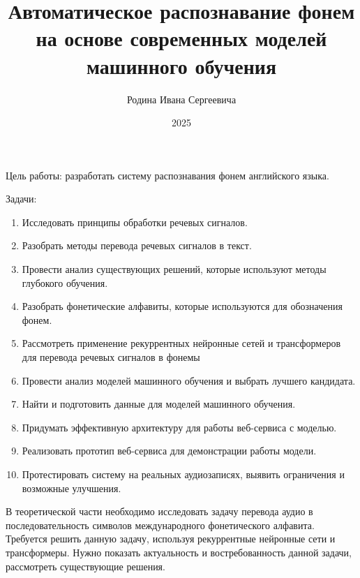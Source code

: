 \documentclass[bachelor, och, assignment, times, article]{../Include/SCWorks}
\begin{document}
\title{Автоматическое распознавание фонем на основе современных моделей машинного обучения}
\author{Родина Ивана Сергеевича}
\date{2025}



\maketitle

Цель работы: разработать систему распознавания фонем английского языка.

Задачи:
\begin{enumerate}
    \item Исследовать принципы обработки речевых сигналов.
    \item Разобрать методы перевода речевых сигналов в текст.
    \item Провести анализ существующих решений, которые используют методы глубокого обучения.
    \item Разобрать фонетические алфавиты, которые используются для обозначения фонем.
    \item Рассмотреть применение рекуррентных нейронные сетей и трансформеров для перевода речевых сигналов в фонемы
    \item Провести анализ моделей машинного обучения и выбрать лучшего кандидата.
    \item Найти и подготовить данные для моделей машинного обучения.
    \item Придумать эффективную архитектуру для работы веб-сервиса с моделью.
    \item Реализовать прототип веб-сервиса для демонстрации работы модели.
    \item Протестировать систему на реальных аудиозаписях, выявить ограничения и возможные улучшения.
\end{enumerate}

В теоретической части необходимо исследовать задачу перевода аудио в последовательность символов международного фонетического алфавита. Требуется решить данную задачу, используя рекуррентные нейронные сети и трансформеры. Нужно показать актуальность и востребованность данной задачи, рассмотреть существующие решения.
\end{document}
